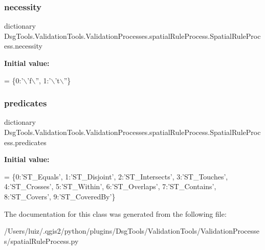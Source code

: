 \subsubsection{\texorpdfstring{necessity}{necessity}}
{\footnotesize\ttfamily dictionary Dsg\+Tools.\+Validation\+Tools.\+Validation\+Processes.\+spatial\+Rule\+Process.\+Spatial\+Rule\+Process.\+necessity\hspace{0.3cm}{\ttfamily [static]}}

{\bfseries Initial value\+:}
\begin{DoxyCode}
=  \{0:\textcolor{stringliteral}{'\(\backslash\)'f\(\backslash\)''},
                 1:\textcolor{stringliteral}{'\(\backslash\)'t\(\backslash\)''}\}
\end{DoxyCode}
\mbox{\label{class_dsg_tools_1_1_validation_tools_1_1_validation_processes_1_1spatial_rule_process_1_1_spatial_rule_process_aca9d38cf3db1437b363b87033327d8dd}} 
\subsubsection{\texorpdfstring{predicates}{predicates}}
{\footnotesize\ttfamily dictionary Dsg\+Tools.\+Validation\+Tools.\+Validation\+Processes.\+spatial\+Rule\+Process.\+Spatial\+Rule\+Process.\+predicates\hspace{0.3cm}{\ttfamily [static]}}

{\bfseries Initial value\+:}
\begin{DoxyCode}
=  \{0:\textcolor{stringliteral}{'ST\_Equals'},
                  1:\textcolor{stringliteral}{'ST\_Disjoint'},
                  2:\textcolor{stringliteral}{'ST\_Intersects'},
                  3:\textcolor{stringliteral}{'ST\_Touches'},
                  4:\textcolor{stringliteral}{'ST\_Crosses'},
                  5:\textcolor{stringliteral}{'ST\_Within'},
                  6:\textcolor{stringliteral}{'ST\_Overlaps'},
                  7:\textcolor{stringliteral}{'ST\_Contains'},
                  8:\textcolor{stringliteral}{'ST\_Covers'},
                  9:\textcolor{stringliteral}{'ST\_CoveredBy'}\}
\end{DoxyCode}


The documentation for this class was generated from the following file\+:\begin{DoxyCompactItemize}
\item 
/\+Users/luiz/.\+qgis2/python/plugins/\+Dsg\+Tools/\+Validation\+Tools/\+Validation\+Processes/spatial\+Rule\+Process.\+py\end{DoxyCompactItemize}
